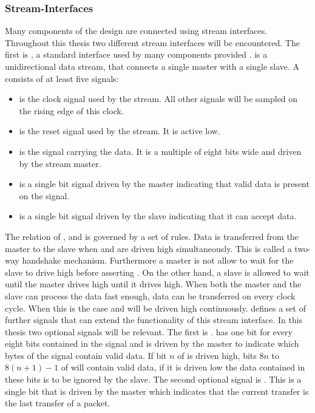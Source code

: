 \subsubsection{Stream-Interfaces}
Many components of the \FPGA{} design are connected using stream interfaces. Throughout this thesis two different stream interfaces will be encountered. The first is \AXIStream{}\autocite{ref:axi_stream}, a standard interface used by many components provided \Xilinx{}.
\AXIStream{} is a unidirectional data stream, that connects a single master with a single slave. A \AXIStream{} consists of at least five signals:
\begin{itemize}
    \item \ACLK{} is the clock signal used by the stream. All other signals will be sampled on the rising edge of this clock.
    \item \ARESETn{} is the reset signal used by the stream. It is active low.
    \item \TDATA{} is the signal carrying the data. It is a multiple of eight bits wide and driven by the stream master.
    \item \TVALID{} is a single bit signal driven by the master indicating that valid data is present on the \TDATA{} signal.
    \item \TREADY{} is a single bit signal driven by the slave indicating that it can accept data.
\end{itemize}
The relation of \TDATA{}, \TVALID{} and \TREADY{} is governed by a set of rules. Data is transferred from the master to the slave when \TREADY{} and \TVALID{} are driven high simultaneously. This is called a two-way handshake mechanism.
Furthermore a master is not allow to wait for the slave to drive \TREADY{} high before asserting \TVALID{}. On the other hand, a slave is allowed to wait until the master drives \TVALID{} high until it drives \TREADY{} high.
When both the master and the slave can process the data fast enough, data can be transferred on every clock cycle. When this is the case \TREADY{} and \TVALID{} will be driven high continuously.
\AXIStream{} defines a set of further signals that can extend the functionality of this stream interface. In this thesis two optional signals will be relevant.
The first is \TKEEP{}. \TKEEP{} has one bit for every eight bits contained in the \TDATA{} signal and is driven by the master to indicate which bytes of the \TDATA{} signal contain valid data.
If bit $n$ of \TKEEP{} is driven high, bits $8n$ to $8(n + 1) - 1$ of \TDATA{} will contain valid data, if it is driven low the data contained in these bits is to be ignored by the slave.
The second optional signal is \TLAST{}. This is a single bit that is driven by the master which indicates that the current transfer is the last transfer of a packet.

